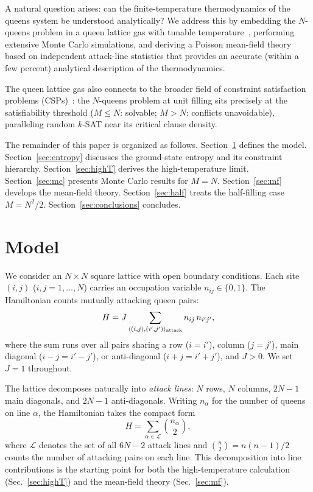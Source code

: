 \documentclass[aps, pre, reprint, amsmath, amssymb, superscriptaddress, floatfix]{revtex4-2}
\begin{document}
A natural question arises: can the finite-temperature thermodynamics
of the queens system be understood analytically?
We address this by embedding the $N$-queens problem in
a queen lattice gas with tunable
temperature~\cite{Zhang2009,Polson2024}, performing extensive Monte
Carlo simulations, and deriving a Poisson mean-field theory based on
independent attack-line statistics that provides an accurate
(within a few percent) analytical description of the thermodynamics.

The queen lattice gas also connects to the broader field of
constraint satisfaction problems (CSPs)~\cite{Mezard2009,Krzakala2007}:
the $N$-queens problem at unit filling sits precisely at the
satisfiability threshold ($M \le N$: solvable; $M > N$: conflicts
unavoidable), paralleling random $k$-SAT near its critical clause
density.

The remainder of this paper is organized as follows.
Section~\ref{sec:model} defines the model.
Section~\ref{sec:entropy} discusses the ground-state entropy and its constraint hierarchy.
Section~\ref{sec:highT} derives the high-temperature limit.
Section~\ref{sec:mc} presents Monte Carlo results for $M = N$.
Section~\ref{sec:mf} develops the mean-field theory.
Section~\ref{sec:half} treats the half-filling case $M = N^2/2$.
Section~\ref{sec:conclusions} concludes.


\section{Model}
\label{sec:model}

We consider an $N \times N$ square lattice with open boundary
conditions.  Each site $(i,j)$ ($i,j = 1,\ldots,N$) carries an
occupation variable $n_{ij} \in \{0,1\}$.  The Hamiltonian counts
mutually attacking queen pairs:
\begin{equation}
  H = J \sum_{\langle (i,j),(i',j') \rangle_{\rm attack}}
  n_{ij}\, n_{i'j'},
  \label{eq:H}
\end{equation}
where the sum runs over all pairs sharing a row ($i = i'$), column
($j = j'$), main diagonal ($i - j = i' - j'$), or anti-diagonal
($i + j = i' + j'$), and $J > 0$.  We set $J = 1$ throughout.

The lattice decomposes naturally into \textit{attack lines}: $N$ rows,
$N$ columns, $2N-1$ main diagonals, and $2N-1$ anti-diagonals.
Writing $n_\alpha$ for the number of queens on line $\alpha$, the
Hamiltonian takes the compact form
\begin{equation}
  H = \sum_{\alpha \in \mathcal{L}} \binom{n_\alpha}{2},
  \label{eq:H_lines}
\end{equation}
where $\mathcal{L}$ denotes the set of all $6N - 2$ attack lines and
$\binom{n}{2} = n(n-1)/2$ counts the number of attacking pairs on
each line.  This decomposition into line contributions is the
starting point for both the high-temperature calculation
(Sec.~\ref{sec:highT}) and the mean-field theory (Sec.~\ref{sec:mf}).
\end{document}
